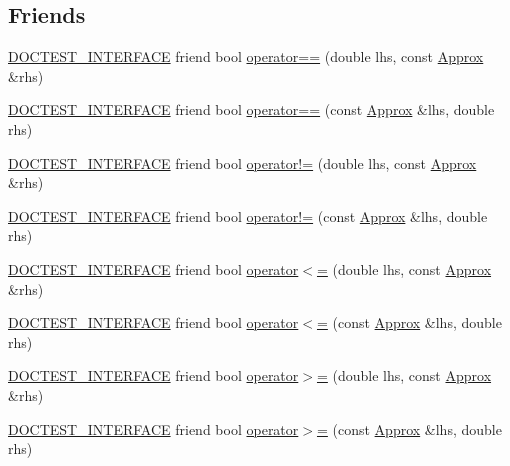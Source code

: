 \subsection*{Friends}
\begin{DoxyCompactItemize}
\item 
\hyperlink{doctest_8h_a9c16ffc635ec47f07797d21ede26b1a5}{D\+O\+C\+T\+E\+S\+T\+\_\+\+I\+N\+T\+E\+R\+F\+A\+CE} friend bool \hyperlink{classdoctest_1_1Approx_a2b6b56551f113fd12f4a52b4d3e5fd7e}{operator==} (double lhs, const \hyperlink{classdoctest_1_1Approx}{Approx} \&rhs)
\item 
\hyperlink{doctest_8h_a9c16ffc635ec47f07797d21ede26b1a5}{D\+O\+C\+T\+E\+S\+T\+\_\+\+I\+N\+T\+E\+R\+F\+A\+CE} friend bool \hyperlink{classdoctest_1_1Approx_a1b99d0c4c3924a253474e68ae30e1175}{operator==} (const \hyperlink{classdoctest_1_1Approx}{Approx} \&lhs, double rhs)
\item 
\hyperlink{doctest_8h_a9c16ffc635ec47f07797d21ede26b1a5}{D\+O\+C\+T\+E\+S\+T\+\_\+\+I\+N\+T\+E\+R\+F\+A\+CE} friend bool \hyperlink{classdoctest_1_1Approx_a44d4bbc575291095c884848887538233}{operator!=} (double lhs, const \hyperlink{classdoctest_1_1Approx}{Approx} \&rhs)
\item 
\hyperlink{doctest_8h_a9c16ffc635ec47f07797d21ede26b1a5}{D\+O\+C\+T\+E\+S\+T\+\_\+\+I\+N\+T\+E\+R\+F\+A\+CE} friend bool \hyperlink{classdoctest_1_1Approx_ae86972ba14656f422afdcc60cd2cdb08}{operator!=} (const \hyperlink{classdoctest_1_1Approx}{Approx} \&lhs, double rhs)
\item 
\hyperlink{doctest_8h_a9c16ffc635ec47f07797d21ede26b1a5}{D\+O\+C\+T\+E\+S\+T\+\_\+\+I\+N\+T\+E\+R\+F\+A\+CE} friend bool \hyperlink{classdoctest_1_1Approx_af2fef67cf4508a446eeaf38dafae661f}{operator$<$=} (double lhs, const \hyperlink{classdoctest_1_1Approx}{Approx} \&rhs)
\item 
\hyperlink{doctest_8h_a9c16ffc635ec47f07797d21ede26b1a5}{D\+O\+C\+T\+E\+S\+T\+\_\+\+I\+N\+T\+E\+R\+F\+A\+CE} friend bool \hyperlink{classdoctest_1_1Approx_a7f32e572caa5ee152b8ade301fcfd838}{operator$<$=} (const \hyperlink{classdoctest_1_1Approx}{Approx} \&lhs, double rhs)
\item 
\hyperlink{doctest_8h_a9c16ffc635ec47f07797d21ede26b1a5}{D\+O\+C\+T\+E\+S\+T\+\_\+\+I\+N\+T\+E\+R\+F\+A\+CE} friend bool \hyperlink{classdoctest_1_1Approx_acf882dbff26c57cd8404da3edd46f45e}{operator$>$=} (double lhs, const \hyperlink{classdoctest_1_1Approx}{Approx} \&rhs)
\item 
\hyperlink{doctest_8h_a9c16ffc635ec47f07797d21ede26b1a5}{D\+O\+C\+T\+E\+S\+T\+\_\+\+I\+N\+T\+E\+R\+F\+A\+CE} friend bool \hyperlink{classdoctest_1_1Approx_a52e1bcec19171f0ec55cc3a280188a03}{operator$>$=} (const \hyperlink{classdoctest_1_1Approx}{Approx} \&lhs, double rhs)

\end{DoxyCompactItemize}
